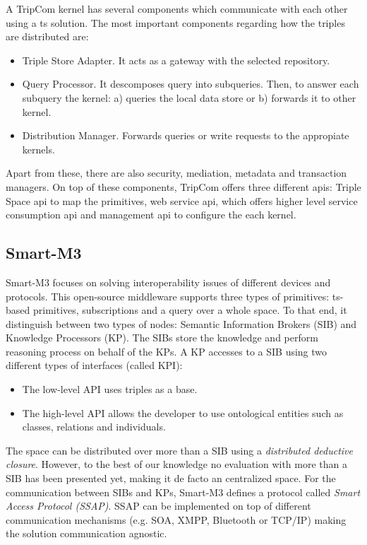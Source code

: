 A TripCom kernel has several components which communicate with each other using a \acl{ts} solution.
The most important components regarding how the triples are distributed are:
\begin{itemize}
  \item Triple Store Adapter.
	It acts as a gateway with the selected repository.
  \item Query Processor. It descomposes query into subqueries.
	Then, to answer each subquery the kernel: a) queries the local data store or b) forwards it to other kernel.
  \item Distribution Manager.
	Forwards queries or write requests to the appropiate kernels.
\end{itemize}
Apart from these, there are also security, mediation, metadata and transaction managers.
On top of these components, TripCom offers three different \acp{api}:
Triple Space \acs{api} to map the primitives,
web service \acs{api}, which offers higher level service consumption \acs{api}
and management \acs{api} to configure the each kernel.



\subsection{Smart-M3}

Smart-M3 \citep{honkola_smart-m3_2010} focuses on solving interoperability issues of different devices and protocols.
This open-source middleware supports three types of primitives: \acl{ts}-based primitives, subscriptions and a query over a whole space.
To that end, it  distinguish between two types of nodes: Semantic Information Brokers (SIB) and Knowledge Processors (KP).
The SIBs store the knowledge and perform reasoning process on behalf of the KPs.
A KP accesses to a SIB using two different types of interfaces (called KPI):
\begin{itemize}
  \item The low-level API uses triples as a base.
  \item The high-level API allows the developer to use ontological entities such as classes, relations and individuals.
\end{itemize}


The space can be distributed over more than a SIB using a \emph{distributed deductive closure}.
However, to the best of our knowledge no evaluation with more than a SIB has been presented yet, making it de facto an centralized space.
For the communication between SIBs and KPs, Smart-M3 defines a protocol called \emph{Smart Access Protocol (SSAP)}. %
SSAP can be implemented on top of different communication mechanisms (e.g. SOA, XMPP, Bluetooth or TCP/IP) making the solution communication agnostic. %


